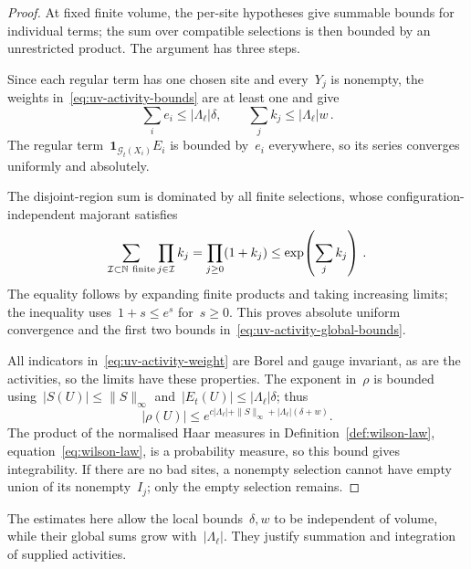\begin{proof}
At fixed finite volume, the per-site hypotheses give summable bounds for individual terms; the sum over compatible selections is then bounded by an unrestricted product.
The argument has three steps.

Since each regular term has one chosen site and every~$Y_j$ is nonempty, the weights in~\eqref{eq:uv-activity-bounds} are at least one and give
\begin{equation}\label{eq:uv-total-majorants}
 \sum_i e_i\le|\Lambda_\ell|\delta,\qquad
 \sum_j k_j\le|\Lambda_\ell|w\,.
\end{equation}
The regular term~$\mathbf1_{\mathcal G_t(X_i)}E_i$ is bounded by~$e_i$ everywhere, so its series converges uniformly and absolutely.

The disjoint-region sum is dominated by all finite selections, whose configuration-independent majorant satisfies
\begin{equation}\label{eq:uv-selection-majorant}
 \sum_{\mathcal I\subset\mathbb N\ \mathrm{finite}}\prod_{j\in\mathcal I}k_j
 =\prod_{j\ge0}(1+k_j)
 \le\exp\!\left(\sum_jk_j\right)\,.
\end{equation}
The equality follows by expanding finite products and taking increasing limits; the inequality uses~$1+s\le e^s$ for~$s\ge0$.
This proves absolute uniform convergence and the first two bounds in~\eqref{eq:uv-activity-global-bounds}.

All indicators in~\eqref{eq:uv-activity-weight} are Borel and gauge invariant, as are the activities, so the limits have these properties.
The exponent in~$\rho$ is bounded using~$|S(U)|\le\|S\|_\infty$ and~$|E_t(U)|\le|\Lambda_\ell|\delta$; thus
\begin{equation*}
 |\rho(U)|\le e^{c|\Lambda_\ell|+\|S\|_\infty+|\Lambda_\ell|(\delta+w)}.
\end{equation*}
The product of the normalised Haar measures in Definition~\ref{def:wilson-law}, equation~\eqref{eq:wilson-law}, is a probability measure, so this bound gives integrability.
If there are no bad sites, a nonempty selection cannot have empty union of its nonempty~$I_j$; only the empty selection remains.
\end{proof}

The estimates here allow the local bounds~$\delta,w$ to be independent of volume, while their global sums grow with~$|\Lambda_\ell|$.
They justify summation and integration of supplied activities.
